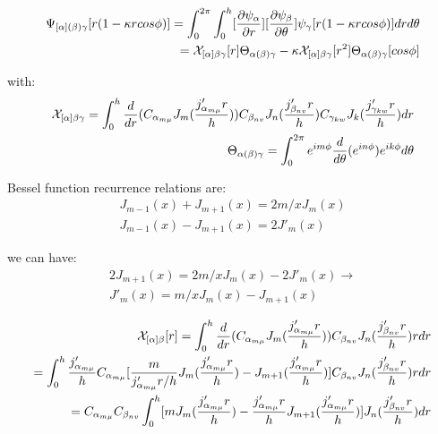 \documentclass{Note}
\begin{document}
\begin{equation}
\begin{aligned}
\Psi_{[\alpha](\beta)\gamma}[r(1-\kappa r cos\phi)]=\int_0^{2\pi} \int_0^h [{\partial \psi_\alpha \over \partial r}][{\partial \psi_\beta \over \partial \theta}] \psi_\gamma [r(1-\kappa r cos\phi)] dr d\theta \\
=\mathcal{X}_{[\alpha]\beta\gamma}[r]\Theta_{\alpha(\beta)\gamma}-\kappa \mathcal{X}_{[\alpha]\beta\gamma}[r^2]\Theta_{\alpha(\beta)\gamma}[cos\phi]
\end{aligned}
\end{equation}

with:
\begin{equation}
\begin{aligned}
\mathcal{X}_{[\alpha]\beta\gamma}=\int_0^h {d\over dr}(C_{\alpha_{m\mu}} J_m({j'_{\alpha_{m\mu}}r\over h}))C_{\beta_{nv}} J_n({j'_{\beta_{nv}}r\over h})C_{\gamma_{kw}} J_k({j'_{\gamma_{kw}}r\over h})dr\\
\Theta_{\alpha(\beta)\gamma}=\int_0^{2\pi} e^{im\phi} {d\over d\theta} (e^{in\phi}) e^{ik\phi} d\theta
\end{aligned}
\end{equation}


Bessel function recurrence relations are:
\begin{equation}
\begin{aligned}
J_{m-1}(x)+J_{m+1}(x)=2m/x J_m(x)\\
J_{m-1}(x)-J_{m+1}(x)=2J'_m(x)
\end{aligned}
\end{equation}

we can have:
\begin{equation}
\begin{aligned}
2J_{m+1}(x)=2m/x J_m(x)-2J'_m(x)\rightarrow \\
J'_m(x)=m/x J_m(x)-J_{m+1}(x)
\end{aligned}
\end{equation}

\begin{equation}
\begin{aligned}
\mathcal{X}_{[\alpha]\beta}[r]=\int_0^h {d\over dr}(C_{\alpha_{m\mu}} J_m({j'_{\alpha_{m\mu}}r\over h}))C_{\beta_{nv}} J_n({j'_{\beta_{nv}}r\over h})r dr\\
=\int_0^h {j'_{\alpha_{m\mu}}\over h} C_{\alpha_{m\mu}} [{m\over {j'_{\alpha_{m\mu}}r/ h}} J_m({j'_{\alpha_{m\mu}}r\over h})- J_{m+1}({j'_{\alpha_{m\mu}}r\over h})]C_{\beta_{nv}} J_n({j'_{\beta_{nv}}r\over h})r dr\\
=C_{\alpha_{m\mu}}C_{\beta_{nv}} \int_0^h[{m} J_m({j'_{\alpha_{m\mu}}r\over h})-{j'_{\alpha_{m\mu}}r\over h} J_{m+1}({j'_{\alpha_{m\mu}}r\over h})] J_n({j'_{\beta_{nv}}r\over h})dr\\
\end{aligned}
\end{equation}
\end{document}
